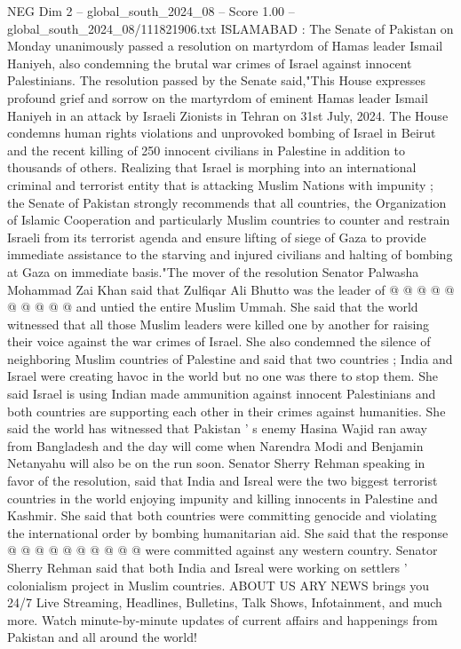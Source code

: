 \begin{textsample}{NEG Dim 2 – global\_south\_2024\_08 – Score 1.00 – global\_south\_2024\_08/111821906.txt}  \label{ex:f2_neg_431}
ISLAMABAD : The Senate of Pakistan on Monday unanimously passed a resolution on martyrdom of Hamas leader Ismail Haniyeh, also condemning the brutal war crimes of Israel against innocent Palestinians.
The resolution passed by the Senate said,"This House expresses profound grief and sorrow on the martyrdom of eminent Hamas leader Ismail Haniyeh in an attack by Israeli Zionists in Tehran on 31st July, 2024.
The House condemns human rights violations and unprovoked bombing of Israel in Beirut and the recent killing of 250 innocent civilians in Palestine in addition to thousands of others.
Realizing that Israel is morphing into an international criminal and terrorist entity that is attacking Muslim Nations with impunity ; the Senate of Pakistan strongly recommends that all countries, the Organization of Islamic Cooperation and particularly Muslim countries to counter and restrain Israeli from its terrorist agenda and ensure lifting of siege of Gaza to provide immediate assistance to the starving and injured civilians and halting of bombing at Gaza on immediate basis."The mover of the resolution Senator Palwasha Mohammad Zai Khan said that Zulfiqar Ali Bhutto was the leader of @ @ @ @ @ @ @ @ @ @ and untied the entire Muslim Ummah.
She said that the world witnessed that all those Muslim leaders were killed one by another for raising their voice against the war crimes of Israel.
She also condemned the silence of neighboring Muslim countries of Palestine and said that two countries ; India and Israel were creating havoc in the world but no one was there to stop them.
She said Israel is using Indian made ammunition against innocent Palestinians and both countries are supporting each other in their crimes against humanities.
She said the world has witnessed that Pakistan ' s enemy Hasina Wajid ran away from Bangladesh and the day will come when Narendra Modi and Benjamin Netanyahu will also be on the run soon.
Senator Sherry Rehman speaking in favor of the resolution, said that India and Isreal were the two biggest terrorist countries in the world enjoying impunity and killing innocents in Palestine and Kashmir.
She said that both countries were committing genocide and violating the international order by bombing humanitarian aid.
She said that the response @ @ @ @ @ @ @ @ @ @ were committed against any western country.
Senator Sherry Rehman said that both India and Isreal were working on settlers ' colonialism project in Muslim countries.
ABOUT US ARY NEWS brings you 24/7 Live Streaming, Headlines, Bulletins, Talk Shows, Infotainment, and much more.
Watch minute-by-minute updates of current affairs and happenings from Pakistan and all around the world!

\end{textsample}
